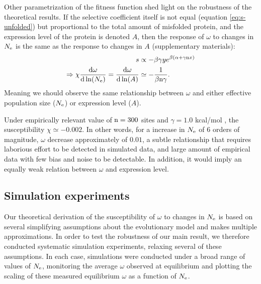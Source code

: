 \documentclass{article}
\begin{document}
	Other parametrization of the fitness function shed light on the robustness of the theoretical results.
	If the selective coefficient itself is not equal (equation \ref{eq:s-unfolded}) but proportional to the total amount of misfolded protein, and the expression level of the protein is denoted $A$, then the response of $\omega$ to changes in $N_{\mathrm{e}}$ is the same as the response to changes in $A$ (supplementary materials):
	\begin{align}
	s & \propto - \beta \gamma y e^{\beta(\alpha + \gamma \text{n} x)} \\
	\Rightarrow \chi \frac{ \mathrm{d} \omega}{\mathrm{d} \ln (N_{\mathrm{e}})} = \frac{ \mathrm{d} \omega}{\mathrm{d} \ln (A)} & \simeq -\dfrac{1}{\beta \text{n} \gamma}.
	\end{align}
	Meaning we should observe the same relationship between $\omega$ and either effective population size ($N_{\mathrm{e}}$) or expression level ($A$).
	
	Under empirically relevant value of $\text{n}=300$ sites and $\gamma=1.0$ kcal/mol \cite{Zeldovich2007}, the susceptibility $\chi \simeq -0.002$.
	In other words, for a increase in $N_{\mathrm{e}}$ of $6$ orders of magnitude, $\omega$ decrease approximately of $0.01$, a subtle relationship that requires laborious effort to be detected in simulated data, and large amount of empirical data with few bias and noise to be detectable. In addition, it would imply an equally weak relation between $\omega$ and expression level.
	
	\subsection*{Simulation experiments}
	
	Our theoretical derivation of the susceptibility of $\omega$ to changes in $N_{\mathrm{e}}$ is based on several simplifying assumptions about the evolutionary model and makes multiple approximations. In order to test the robustness of our main result, we therefore conducted systematic simulation experiments, relaxing several of these assumptions. In each case, simulations were conducted under a broad range of values of $N_{\mathrm{e}}$, monitoring the average $\omega$ observed at equilibrium and plotting the scaling of these measured equilibrium $\omega$ as a function of $N_{\mathrm{e}}$. 
	
\end{document}
